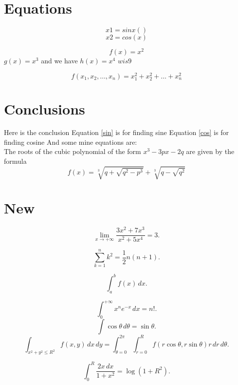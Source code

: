 \documentclass[a4paper,7pt]{article}
\begin{document}
\section{Equations}
\begin{equation}
     x1=sinx()
     \label{sin}
\end{equation}
\begin{equation}
     x2=cos(x)
     \label{cos}
\end{equation}


\[f(x)=x^2	\] 
\(g(x)=x^3	\) and we have \(h(x)=x^4	\)
$ w     is    9 $
\newline

\[f(x_1,x_2,\ldots,x_n)=x_1^2+x_2^2+\ldots+x_n^2\]





\section{Conclusions}
Here is the conclusion
Equation \ref{sin} is for finding sine
Equation \ref{cos} is for finding cosine\newline
And some mine equations are:\\
The roots of the cubic polynomial of the form $x^3 -3px -2q$ are given by the formula \newline
\[f(x)=\sqrt[3]{q+\sqrt{q^2 - p^3}}+\sqrt[3]{q-\sqrt{q^2}}\]



\section{New}


\[ \lim_{x \to +\infty} \frac{3x^2 +7x^3}{x^2 +5x^4} = 3.\]

\[ \sum_{k=1}^n k^2 = \frac{1}{2} n (n+1).\]

\[ \int_a^b f(x)\,dx.\]

\[ \int_0^{+\infty} x^n e^{-x} \,dx = n!.\]
\[ \int \cos \theta \,d\theta = \sin \theta.\]
\[ \int_{x^2 + y^2 \leq R^2} f(x,y)\,dx\,dy
     = \int_{\theta=0}^{2\pi} \int_{r=0}^R
f(r\cos\theta,r\sin\theta) r\,dr\,d\theta.\]

\[ \int_0^R \frac{2x\,dx}{1+x^2} = \log(1+R^2).\]
\end{document}
